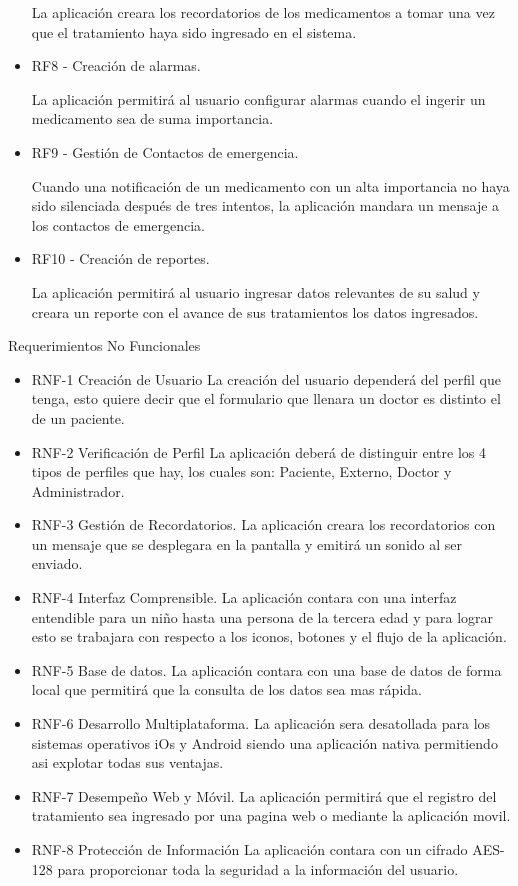 \begin{itemize}
	La aplicación creara los recordatorios de los medicamentos a tomar  una vez que el tratamiento haya sido ingresado en el sistema.
	
	\item RF8 - Creación de alarmas.
	
	La aplicación permitirá al usuario configurar alarmas cuando el ingerir un medicamento sea de suma importancia.
	
	\item RF9 - Gestión de Contactos de emergencia.
	
	Cuando una notificación de un medicamento con un alta importancia no haya sido silenciada después de tres intentos, la aplicación mandara un mensaje a los contactos de emergencia.
	
	\item RF10 - Creación de reportes.
	
	La aplicación permitirá al usuario ingresar datos relevantes de su salud y creara un reporte con el avance de sus tratamientos los datos ingresados.
	
	
	
	
	
	
\end{itemize}
Requerimientos No Funcionales
\begin{itemize}
	\item RNF-1 Creación de Usuario
	La creación del usuario dependerá del perfil que tenga, esto quiere decir que el formulario que llenara un doctor es distinto el de un paciente.
	\item RNF-2 Verificación de Perfil
	La aplicación deberá de distinguir entre los 4 tipos de perfiles que hay, los cuales son: Paciente, Externo, Doctor y Administrador.
	\item RNF-3 Gestión de Recordatorios.
	La aplicación creara los recordatorios con un mensaje que se desplegara en la pantalla y emitirá un sonido al ser enviado.
	\item RNF-4 Interfaz Comprensible.
	La aplicación contara con una interfaz entendible para un niño hasta una persona de la tercera edad y para lograr esto se trabajara con respecto a los iconos, botones y el flujo de la aplicación.
	\item RNF-5 Base de datos.
	La aplicación contara con una base de datos de forma local que permitirá que la consulta de los datos sea mas rápida.
	\item RNF-6 Desarrollo Multiplataforma.
	La aplicación sera desatollada para los sistemas operativos iOs y Android siendo una aplicación nativa permitiendo asi explotar todas sus ventajas.
	\item RNF-7 Desempeño Web y Móvil.
	La aplicación permitirá que el registro del tratamiento sea ingresado por una pagina web o mediante la aplicación movil. 
	\item RNF-8	Protección de Información
	La aplicación contara con un cifrado AES-128 para proporcionar toda la seguridad a la información del usuario.
\end{itemize}

